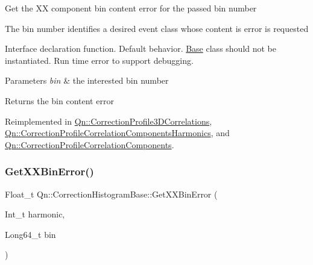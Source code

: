 Get the XX component bin content error for the passed bin number

The bin number identifies a desired event class whose content is error is requested

Interface declaration function. Default behavior. \mbox{\hyperlink{classBase}{Base}} class should not be instantiated. Run time error to support debugging.


\begin{DoxyParams}{Parameters}
{\em bin} & the interested bin number \\
\hline
\end{DoxyParams}
\begin{DoxyReturn}{Returns}
the bin content error 
\end{DoxyReturn}


Reimplemented in \mbox{\hyperlink{classQn_1_1CorrectionProfile3DCorrelations_a707cfe8bdc3ff7499a007f3d09688423}{Qn\+::\+Correction\+Profile3\+D\+Correlations}}, \mbox{\hyperlink{classQn_1_1CorrectionProfileCorrelationComponentsHarmonics_a492f84a9286ac565f42933d1630b1e0e}{Qn\+::\+Correction\+Profile\+Correlation\+Components\+Harmonics}}, and \mbox{\hyperlink{classQn_1_1CorrectionProfileCorrelationComponents_a76bba719fcab0995255c8309dcaf6c72}{Qn\+::\+Correction\+Profile\+Correlation\+Components}}.

\mbox{\label{classQn_1_1CorrectionHistogramBase_a6c0874928f737e86a7f72cba9a9922b7}} 
\subsubsection{\texorpdfstring{Get\+X\+X\+Bin\+Error()}{GetXXBinError()}\hspace{0.1cm}{\footnotesize\ttfamily [2/2]}}
{\footnotesize\ttfamily Float\+\_\+t Qn\+::\+Correction\+Histogram\+Base\+::\+Get\+X\+X\+Bin\+Error (\begin{DoxyParamCaption}\item[{Int\+\_\+t}]{harmonic,  }\item[{Long64\+\_\+t}]{bin }\end{DoxyParamCaption})\hspace{0.3cm}{\ttfamily [virtual]}}

